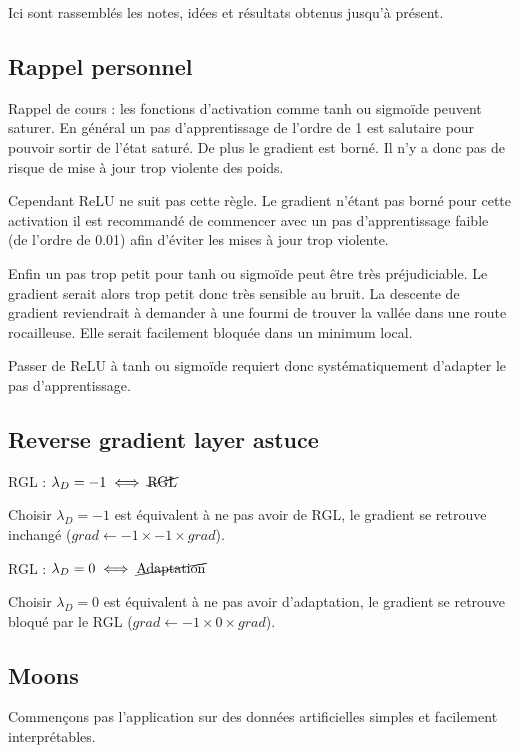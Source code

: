 
Ici sont rassemblés les notes, idées et résultats obtenus jusqu'à présent.

\subsection{Rappel personnel} %
\label{sub:rappel_personnel}

Rappel de cours : les fonctions d'activation comme tanh ou sigmoïde peuvent 
saturer. En général un pas d'apprentissage de l'ordre de 1 est salutaire pour 
pouvoir sortir de l'état saturé. De plus le gradient est borné. Il n'y a donc 
pas de risque de mise à jour trop violente des poids.

Cependant ReLU ne suit pas cette règle. Le gradient n'étant pas borné pour 
cette activation il est recommandé de commencer avec un pas d'apprentissage
faible (de l'ordre de 0.01) afin d'éviter les mises à jour trop violente.

Enfin un pas trop petit pour tanh ou sigmoïde peut être très préjudiciable.
Le gradient serait alors trop petit donc très sensible au bruit.
La descente de gradient reviendrait à demander à une fourmi de trouver la 
vallée dans une route rocailleuse. Elle serait facilement bloquée dans un
minimum local.

Passer de ReLU à tanh ou sigmoïde requiert donc systématiquement d'adapter
le pas d'apprentissage.

\subsection{Reverse gradient layer astuce} %
\label{sub:reverse_gradient_layer_astuce}

RGL : $\lambda_D = -1 \iff \cancel{\text{RGL}}$

Choisir $\lambda_D = -1$ est équivalent à ne pas avoir de RGL, le gradient se 
retrouve inchangé ($grad \gets -1\times-1\times grad $).

RGL : $\lambda_D = 0 \iff \cancel{\text{Adaptation}}$

Choisir $\lambda_D = 0$ est équivalent à ne pas avoir d'adaptation, le gradient se 
retrouve bloqué par le RGL ($grad \gets -1\times0\times grad $).

\subsection{Moons} %
\label{sub:moons}
Commençons pas l'application sur des données artificielles simples et 
facilement interprétables.

